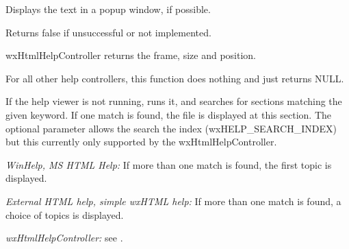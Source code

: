 \label{wxhelpcontrollerdisplaytextpopup}


Displays the text in a popup window, if possible.

Returns false if unsuccessful or not implemented.

\label{wxhelpcontrollergetframeparameters}


wxHtmlHelpController returns the frame, size and position.

For all other help controllers, this function does nothing
and just returns NULL.




\label{wxhelpcontrollerkeywordsearch}


If the help viewer is not running, runs it, and searches for sections matching
the given keyword. If one match is found, the file is displayed at this
section. The optional parameter allows the search the index
(wxHELP\_SEARCH\_INDEX) but this currently only supported by the
wxHtmlHelpController.

{\it WinHelp, MS HTML Help:} If more than one match is found, 
the first topic is displayed.

{\it External HTML help, simple wxHTML help:} If more than one match is found, 
a choice of topics is displayed.

{\it wxHtmlHelpController:} see .

\label{wxhelpcontrollerloadfile}


